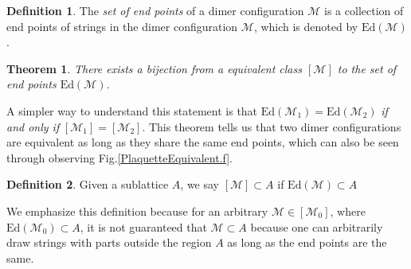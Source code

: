 \documentclass[12font]{article}
\newtheorem{theorem}{Theorem}[section]
\theoremstyle{definition}
\newtheorem{definition}{Definition}[section]
\numberwithin{equation}{section}
\newcommand{\mrm}[1]{\mathrm{#1}}
\begin{document}
\begin{definition}
  The \emph{set of end points} of a dimer configuration $\mathcal{M}$ is a collection of end points of strings in the dimer configuration $\mathcal{M}$, which is denoted by $\mrm{Ed}(\mathcal{M})$.
\end{definition}

\begin{theorem}
  There exists a bijection from a equivalent class $[\mathcal{M}]$ to the set of end points $\mrm{Ed}(\mathcal{M})$. 
\end{theorem}
A simpler way to understand this statement is that $\mrm{Ed}(\mathcal{M}_1) = \mrm{Ed}(\mathcal{M}_2)$ \emph{if and only if} $[\mathcal{M}_1] = [\mathcal{M}_2]$. This theorem tells us that two dimer configurations are equivalent as long as they share the same end points, which can also be seen through observing Fig.\ref{PlaquetteEquivalent.f}.
\begin{definition}
  Given a sublattice $A$, we say $[\mathcal{M}]\subset A$ if $\mrm{Ed}(\mathcal{M})\subset A$
\end{definition}
We emphasize this definition because for an arbitrary $\mathcal{M}\in[\mathcal{M}_0]$, where $\mrm{Ed}(\mathcal{M}_0)\subset A$, it is not guaranteed that $\mathcal{M}\subset A$ because one can arbitrarily draw strings with parts outside the region $A$ as long as the end points are the same.
\end{document}
